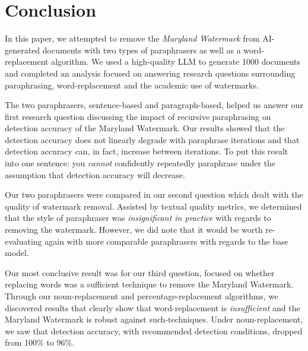 \documentclass{l4proj}
\theoremstyle{definition}
\begin{document}
\chapter{Conclusion}

In this paper, we attempted to remove the \emph{Maryland Watermark} from AI-generated documents with two types of paraphrasers as well as a word-replacement algorithm. We used a high-quality LLM to generate 1000 documents and completed an analysis focused on answering research questions surrounding paraphrasing, word-replacement and the academic use of watermarks.

The two paraphrasers, sentence-based and paragraph-based, helped us answer our first research question discussing the impact of recursive paraphrasing on detection accuracy of the Maryland Watermark. Our results showed that the detection accuracy does not linearly degrade with paraphrase iterations and that detection accuracy can, in fact, increase between iterations. To put this result into one sentence: you \emph{cannot} confidently repeatedly paraphrase under the assumption that detection accuracy will decrease.

Our two paraphrasers were compared in our second question which dealt with the quality of watermark removal. Assisted by textual quality metrics, we determined that the style of paraphraser was \emph{insignificant in practice} with regards to removing the watermark. However, we did note that it would be worth re-evaluating again with more comparable paraphrasers with regards to the base model.

Our most conclusive result was for our third question, focused on whether replacing words was a sufficient technique to remove the Maryland Watermark. Through our noun-replacement and percentage-replacement algorithms, we discovered results that clearly show that word-replacement is \emph{insufficient} and the Maryland Watermark is robust against such-techniques. Under noun-replacement, we saw that detection accuracy, with recommended detection conditions, dropped from 100\% to 96\%. 
\end{document}
